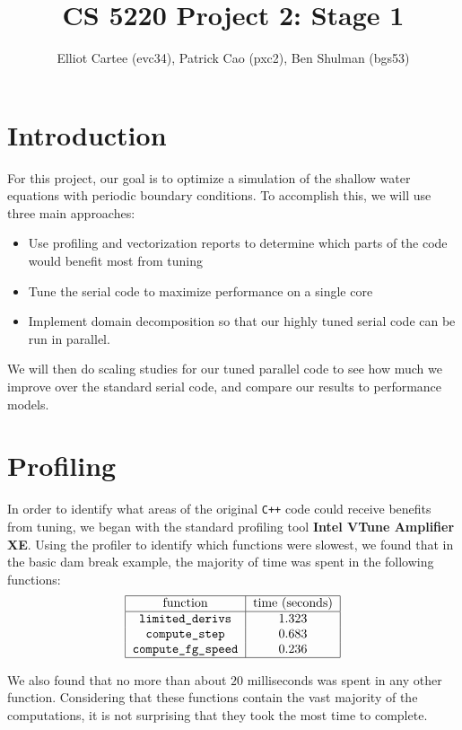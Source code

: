 \documentclass[11pt]{article}
\title{CS 5220 Project 2: Stage 1}
\date{}
\author{Elliot Cartee (evc34), Patrick Cao (pxc2), Ben Shulman (bgs53)}
\newcommand{\ttt}{\texttt}
\begin{document}
\maketitle

\section{Introduction}

For this project, our goal is to optimize a simulation of the shallow water equations with periodic boundary conditions. To accomplish this, we will use three main approaches:
\begin{itemize}
	\item Use profiling and vectorization reports to determine which parts of the code would benefit most from tuning
	\item Tune the serial code to maximize performance on a single core
	\item Implement domain decomposition so that our highly tuned serial code can be run in parallel.
\end{itemize}
We will then do scaling studies for our tuned parallel code to see how much we improve over the standard serial code, and compare our results to performance models.

\section{Profiling}

In order to identify what areas of the original \ttt{C++} code could receive benefits from tuning, we began with the standard profiling tool \textbf{Intel VTune Amplifier XE}. Using the profiler to identify which functions were slowest, we found that in the basic dam break example, the majority of time was spent in the following functions:
$$
\begin{tabular}{|c|c|}
	\hline
	function & time (seconds) \\
	\hline
	\ttt{limited\_derivs} & 1.323 \\
	\ttt{compute\_step} & 0.683 \\
	\ttt{compute\_fg\_speed} & 0.236 \\
	\hline
\end{tabular}
$$

We also found that no more than about $20$ milliseconds was spent in any other function.
Considering that these functions contain the vast majority of the computations, it is not surprising that they took the most time to complete.
\end{document}
